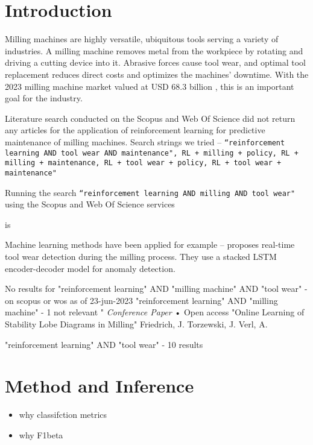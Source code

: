 \documentclass[]{article}
\begin{document}
\section{Introduction}

Milling machines are highly versatile, ubiquitous tools serving a variety of industries. A milling machine removes metal from the workpiece by rotating and driving a cutting device into it. Abrasive forces cause tool wear, and optimal tool replacement reduces direct costs and optimizes the machines' downtime. With the 2023 milling machine market valued at USD 68.3 billion \citep{milling-market}, this is an important goal for the industry.


Literature search conducted on the Scopus\texttrademark{} and Web Of Science\texttrademark{} did not return any articles for the application of reinforcement learning for predictive maintenance of milling machines. Search strings we tried -- \texttt{``reinforcement learning AND tool wear AND maintenance", RL + milling + policy, RL + milling + maintenance, RL + tool wear + policy, RL + tool wear + maintenance"} 

Running the search \texttt{``reinforcement learning AND milling AND tool wear"} using the Scopus\texttrademark{} and Web Of Science\texttrademark{} services 

\cite{dai2021reinforcement} is 

Machine learning methods have been applied for example --
\cite{oshida2023development} proposes real-time tool wear detection during the milling process. They use a stacked LSTM encoder-decoder model for anomaly detection.


No results for "reinforcement learning" AND "milling machine" AND "tool wear" - on scopus or wos as of 23-jun-2023
"reinforcement learning" AND "milling machine" - 1 not relevant "	
\textit{Conference Paper}  •  Open access "Online Learning of Stability Lobe Diagrams in Milling" 	
Friedrich, J. Torzewski, J.  Verl, A.

"reinforcement learning" AND "tool wear" - 10 results


\section{Method and Inference}
\begin{itemize}
	\item why classifction metrics
	\item why F1beta
\end{itemize}
\end{document}

